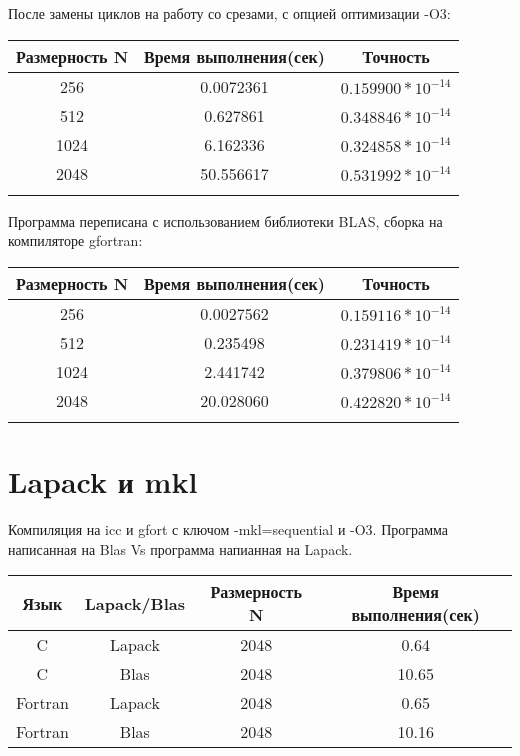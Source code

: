\documentclass[10pt]{article}
\begin{document}
После замены циклов на работу со срезами, с опцией оптимизации -O3:
\begin{center}
    \begin{tabular}{c|c|c}
      Размерность N & Время выполнения(сек) & Точность \\
      \hline
      256 & 0.0072361 & $0.159900 * 10^{-14}$ \\
      \hline
      512 &  0.627861 & $0.348846 * 10^{-14}$ \\
      \hline
      1024 & 6.162336 & $0.324858 * 10^{-14}$ \\
      \hline
      2048 & 50.556617  & $0.531992 * 10^{-14}$ \\
      \\
    \end{tabular}
\end{center}

Программа переписана с использованием библиотеки BLAS, сборка на компиляторе gfortran:
\begin{center}
    \begin{tabular}{c|c|c}
      Размерность N & Время выполнения(сек) & Точность \\
      \hline
      256 & 0.0027562 & $0.159116 * 10^{-14}$ \\
      \hline
      512 &  0.235498 & $0.231419 * 10^{-14}$ \\
      \hline
      1024 & 2.441742 & $0.379806 * 10^{-14}$ \\
      \hline
      2048 & 20.028060  & $0.422820 * 10^{-14}$ \\
      \\
    \end{tabular}
\end{center}

\section{Lapack и mkl}

Компиляция на icc и gfort с ключом -mkl=sequential и -O3. Программа написанная на Blas Vs программа напианная на Lapack.
\begin{center}
    \begin{tabular}{c|c|c|c}
      Язык & Lapack/Blas & Размерность N & Время выполнения(сек) \\
      \hline
      C & Lapack & 2048 & 0.64 \\
      \hline
      C &  Blas & 2048 & 10.65 \\
      \hline
      Fortran & Lapack & 2048 & 0.65 \\
      \hline
      Fortran &  Blas & 2048 &  10.16 \\
      \hline
    \end{tabular}
\end{center}
\end{document}
